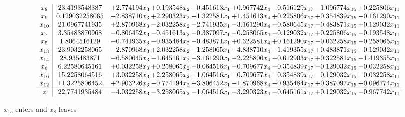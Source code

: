 \documentclass[10pt]{article}
\begin{document}
 \[\begin{array}{c| c c@{\hskip 2pt} c@{\hskip 2pt} c@{\hskip 2pt} c@{\hskip 2pt} c@{\hskip 2pt} c@{\hskip 2pt} c@{\hskip 2pt} }
 x_{8}   &  23.4193548387 & + 2.774194 x_{3} & + 0.193548 x_{2} & -0.451613 x_{1} & + 0.967742 x_{4} & -0.516129 x_{17} & -1.096774 x_{15} & + 0.225806 x_{11}\\
 x_{9}   &  0.129032258065 & -2.838710 x_{3} & + 2.290323 x_{2} & + 1.322581 x_{1} & + 1.451613 x_{4} & + 0.225806 x_{17} & + 0.354839 x_{15} & -0.161290 x_{11}\\
 x_{10}   &  21.0967741935 & + 2.870968 x_{3} & -2.032258 x_{2} & + 2.741935 x_{1} & -3.161290 x_{4} & -0.580645 x_{17} & -0.483871 x_{15} & + 0.129032 x_{11}\\
 x_{7}   &  3.35483870968 & -0.806452 x_{3} & -0.451613 x_{2} & + 0.387097 x_{1} & -0.258065 x_{4} & -0.129032 x_{17} & + 0.225806 x_{15} & -0.193548 x_{11}\\
 x_{5}   &  1.8064516129 & -0.741935 x_{3} & -0.935484 x_{2} & -0.483871 x_{1} & + 0.322581 x_{4} & + 0.161290 x_{17} & -0.032258 x_{15} & -0.258065 x_{11}\\
 x_{13}   &  23.9032258065 & -2.870968 x_{3} & + 2.032258 x_{2} & + 1.258065 x_{1} & -4.838710 x_{4} & -1.419355 x_{17} & + 0.483871 x_{15} & -0.129032 x_{11}\\
 x_{14}   &  28.935483871 & -6.580645 x_{3} & -1.645161 x_{2} & -3.161290 x_{1} & -2.225806 x_{4} & -0.612903 x_{17} & + 0.322581 x_{15} & -1.419355 x_{11}\\
 x_{6}   &  6.22580645161 & + 0.032258 x_{3} & + 0.258065 x_{2} & + 0.064516 x_{1} & -0.709677 x_{4} & -0.354839 x_{17} & -0.129032 x_{15} & -0.032258 x_{11}\\
 x_{16}   &  15.2258064516 & + 3.032258 x_{3} & + 2.258065 x_{2} & + 1.064516 x_{1} & -0.709677 x_{4} & -0.354839 x_{17} & -0.129032 x_{15} & -0.032258 x_{11}\\
 x_{12}   &  11.3225806452 & + 2.903226 x_{3} & -0.774194 x_{2} & + 3.806452 x_{1} & -1.870968 x_{4} & -0.935484 x_{17} & + 0.387097 x_{15} & + 0.096774 x_{11}\\
\hline
z    &  22.7741935484 & -4.032258 x_{3} & -3.258065 x_{2} & -1.064516 x_{1} & -3.290323 x_{4} & -0.645161 x_{17} & + 0.129032 x_{15} & -0.967742 x_{11}\\
\end{array}\]


 $ x_{15} $ enters and $ x_{8} $ leaves 
\end{document}
